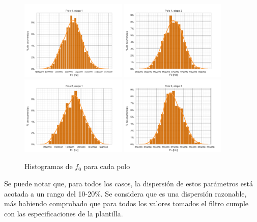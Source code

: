 \documentclass[spanish]{article}
\begin{document}
\begin{figure}[H]
    \centering
    \includegraphics[width=0.45\textwidth]{Resources/histograma_w0_poles_00.png}
    \includegraphics[width=0.45\textwidth]{Resources/histograma_w0_poles_01.png}
    \includegraphics[width=0.45\textwidth]{Resources/histograma_w0_poles_10.png}
    \includegraphics[width=0.45\textwidth]{Resources/histograma_w0_poles_11.png}
    \caption{Histogramas de $f_{0}$ para cada polo}
    \label{sedrahistf0}
\end{figure}
Se puede notar que, para todos los casos, la dispersión de estos parámetros está acotada a un rango del 10-20\%. Se considera que es una dispersión razonable, más habiendo comprobado que para todos los valores tomados el filtro cumple con las especificaciones de la plantilla.
\end{document}
